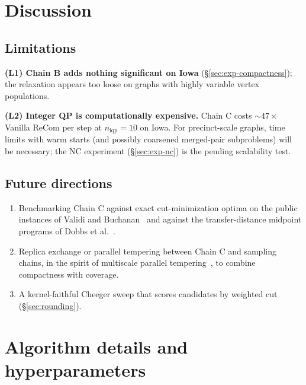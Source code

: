 \documentclass[11pt]{article}
\begin{document}
\section{Discussion}\label{sec:discussion}

\subsection{Limitations}\label{sec:disc-limits}

\textbf{(L1) Chain B adds nothing significant on Iowa}
(\S\ref{sec:exp-compactness}); the relaxation appears too loose on
graphs with highly variable vertex populations.

\textbf{(L2) Integer QP is computationally expensive.} Chain C costs
$\sim 47\times$ Vanilla ReCom per step at $n_{\mathrm{iqp}} = 10$ on
Iowa. For precinct-scale graphs, time limits with warm starts (and
possibly coarsened merged-pair subproblems) will be necessary; the
NC experiment (\S\ref{sec:exp-nc}) is the pending scalability test.

\subsection{Future directions}\label{sec:disc-future}
\begin{enumerate}
  \item Benchmarking Chain C against exact cut-minimization optima on
    the public instances of Validi and
    Buchanan~\cite{validi2022political} and against the
    transfer-distance midpoint programs of Dobbs et
    al.~\cite{dobbs2024facilitating}.
  \item Replica exchange or parallel tempering between Chain C and
    sampling chains, in the spirit of multiscale parallel
    tempering~\cite{chuang2025multiscale}, to combine compactness with
    coverage.
  \item A kernel-faithful Cheeger sweep that scores candidates by
    weighted cut (\S\ref{sec:rounding}).
\end{enumerate}


\appendix
\section{Algorithm details and hyperparameters}\label{app:hyperparams}
\end{document}
